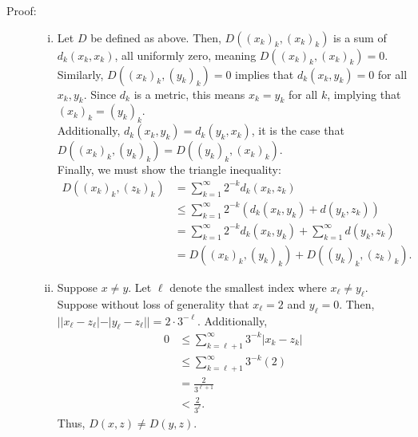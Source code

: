 \documentclass[8pt]{extarticle}
\begin{document}
  \begin{description}
    \item[Proof:]\hfill
      \begin{enumerate}[(i)]
        \item Let $D$ be defined as above. Then, $D((x_k)_k,(x_k)_k)$ is a sum of $d_k(x_k,x_k)$, all uniformly zero, meaning $D((x_k)_k,(x_k)_k)= 0$.\\

          Similarly, $D((x_k)_k,(y_k)_k) = 0$ implies that $d_k(x_k,y_k) = 0$ for all $x_k,y_k$. Since $d_k$ is a metric, this means $x_k = y_k$ for all $k$, implying that $(x_k)_k = (y_k)_k$.\\

          Additionally, $d_k(x_k,y_k) = d_k(y_k,x_k)$, it is the case that $D((x_k)_k,(y_k)_k) = D((y_k)_k,(x_k)_k)$.\\

          Finally, we must show the triangle inequality:
          \begin{align*}
            D((x_k)_k,(z_k)_k) &= \sum_{k=1}^{\infty}2^{-k}d_k(x_k,z_k)\\
                               &\leq \sum_{k=1}^{\infty}2^{-k}(d_k(x_k,y_k) + d(y_k,z_k))\\
                               &= \sum_{k=1}^{\infty}2^{-k}d_k(x_k,y_k) + \sum_{k=1}^{\infty}d(y_k,z_k)\\
                               &= D((x_k)_k,(y_k)_k) + D((y_k)_k,(z_k)_k).
          \end{align*}
        \item Suppose $x \neq y$. Let $\ell$ denote the smallest index where $x_{\ell}\neq y_{\ell}$. Suppose without loss of generality that $x_{\ell} = 2$ and $y_{\ell} = 0$. Then, $||x_\ell-z_{\ell}| - |y_{\ell}-z_{\ell}|| = 2\cdot 3^{-\ell}$. Additionally,
          \begin{align*}
            0 &\leq \sum_{k=\ell + 1}^{\infty}3^{-k}|x_{k}-z_{k}|\\
              &\leq \sum_{k=\ell + 1}^{\infty}3^{-k}(2)\\
              &= \frac{2}{3^{\ell + 1}}\\
              &< \frac{2}{3^{\ell}}.
          \end{align*}
          Thus, $D(x,z) \neq D(y,z)$.
      \end{enumerate}
  \end{description}
\end{document}
